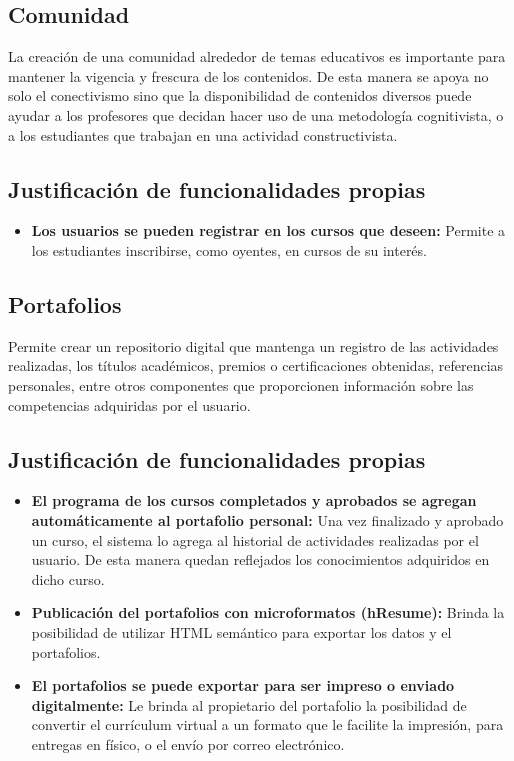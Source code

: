 \subsection{Comunidad}

La creación de una comunidad alrededor de temas educativos es importante para mantener la vigencia y frescura de los contenidos. De esta manera se apoya no solo el conectivismo sino que la disponibilidad de contenidos diversos puede ayudar a los profesores que decidan hacer uso de una metodología cognitivista, o a los estudiantes que trabajan en una actividad constructivista.  

\subsection*{Justificación de funcionalidades propias}

\begin{itemize}

\item \textbf{Los usuarios se pueden registrar en los cursos que deseen:} Permite a los estudiantes inscribirse, como oyentes, en cursos de su interés.

\end{itemize}

\subsection{Portafolios} 

Permite crear un repositorio digital que mantenga un registro de las actividades realizadas, los títulos académicos, premios o certificaciones obtenidas, referencias personales, entre otros componentes que proporcionen información sobre las competencias adquiridas por el usuario. 

\subsection*{Justificación de funcionalidades propias}

\begin{itemize}

\item \textbf{El programa de los cursos completados y aprobados se agregan automáticamente al portafolio personal:} Una vez finalizado y aprobado un curso, el sistema lo agrega al historial de actividades realizadas por el usuario. De esta manera quedan reflejados los conocimientos adquiridos en dicho curso.

\item \textbf{Publicación del portafolios con microformatos (hResume):} Brinda la posibilidad de utilizar HTML semántico para exportar los datos y el portafolios.


\item \textbf{El portafolios se puede exportar para ser impreso o enviado digitalmente:} Le brinda al propietario del portafolio la posibilidad de convertir el currículum virtual a un formato que le facilite la impresión, para entregas en físico, o el envío por correo electrónico.

\end{itemize}


